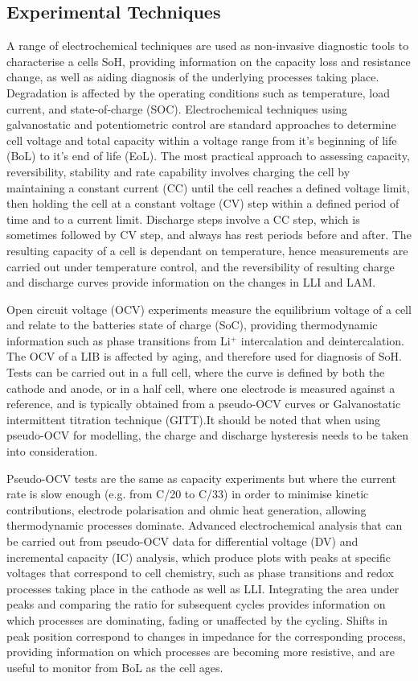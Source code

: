 \documentclass[aps,prb,twocolumn,superscriptaddress,reprint]{revtex4-1}
\begin{document}
\subsection{Experimental Techniques}
A range of electrochemical techniques are used as non-invasive diagnostic tools to characterise a cells SoH, providing information on the capacity loss and resistance change, as well as aiding diagnosis of the underlying processes taking place. Degradation is affected by the operating conditions such as temperature, load current, and state-of-charge (SOC). Electrochemical techniques using galvanostatic and potentiometric control are standard approaches to determine cell voltage and total capacity within a voltage range from it’s beginning of life (BoL) to it’s end of life (EoL). The most practical approach to assessing capacity, reversibility, stability and rate capability involves charging the cell by maintaining a constant current (CC) until the cell reaches a defined voltage limit, then holding the cell at a constant voltage (CV) step within a defined period of time and to a current limit. Discharge steps involve a CC step, which is sometimes  followed by CV step, and always has rest periods before and after. The resulting capacity of a cell is dependant on temperature, hence measurements are carried out under temperature control, and the reversibility of resulting charge and discharge curves provide information on the changes in LLI and LAM.\cite{Birkl2017}

Open circuit voltage (OCV) experiments measure the equilibrium voltage of a cell and relate to the batteries state of charge (SoC), providing thermodynamic information such as phase transitions from Li$^{+}$ intercalation and deintercalation. The OCV of a LIB is affected by aging, and therefore used for diagnosis of SoH. Tests can be carried out in a full cell, where the curve is defined by both the cathode and anode, or in a half cell, where one electrode is measured against a reference, and is typically obtained from a pseudo-OCV curves or Galvanostatic intermittent titration technique (GITT).It should be noted that when using pseudo-OCV for modelling, the charge and discharge hysteresis needs to be taken into consideration.\cite{Garcia-Plaza2017} 

Pseudo-OCV tests are the same as capacity experiments but where the current rate is slow enough (e.g. from C/20 to C/33) in order to minimise kinetic contributions, electrode polarisation and ohmic heat generation, allowing thermodynamic processes dominate.\cite{Bloom2005} Advanced electrochemical analysis that can be carried out from pseudo-OCV data for differential voltage (DV) and incremental capacity (IC) analysis, which produce plots with peaks at specific voltages that correspond to cell chemistry, such as phase transitions and redox processes taking place in the cathode as well as LLI.\cite{Bloom2005} Integrating the area under peaks and comparing the ratio for subsequent cycles provides information on which processes are dominating, fading or unaffected by the cycling. Shifts in peak position correspond to changes in impedance for the corresponding process, providing information on which processes are becoming more resistive, and are useful to monitor from BoL as the cell ages.\cite{Barai2019} 
\end{document}
